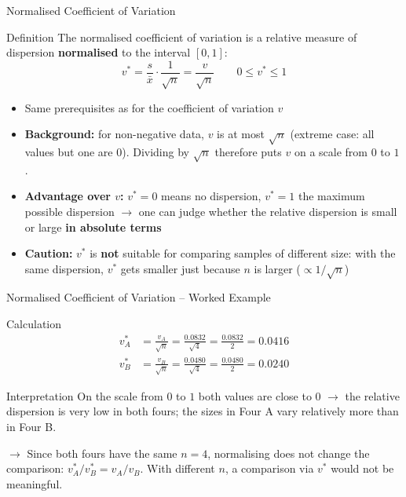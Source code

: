\documentclass[aspectratio=169,11pt]{beamer}
\begin{document}
\begin{frame}{Normalised Coefficient of Variation}
  \begin{block}{Definition}
    The normalised coefficient of variation is a relative measure of dispersion
    \textbf{normalised} to the interval $[0, 1]$:
    \[ v^* = \frac{s}{\bar{x}} \cdot \frac{1}{\sqrt{n}} = \frac{v}{\sqrt{n}} \qquad 0 \leq v^* \leq 1 \]
  \end{block}

  \begin{itemize}
    \item Same prerequisites as for the coefficient of variation $v$
    \item \textbf{Background:} for non-negative data, $v$ is at most $\sqrt{n}$ (extreme case: all
      values but one are $0$). Dividing by $\sqrt{n}$ therefore puts $v$ on a scale from $0$ to $1$.
    \item \textbf{Advantage over $v$:} $v^* = 0$ means no dispersion, $v^* = 1$ the maximum possible
      dispersion $\to$ one can judge whether the relative dispersion is small or large
      \textbf{in absolute terms}
    \item \textbf{Caution:} $v^*$ is \textbf{not} suitable for comparing samples of different size:
      with the same dispersion, $v^*$ gets smaller just because $n$ is larger ($\propto 1/\sqrt{n}$)
  \end{itemize}
\end{frame}

\begin{frame}{Normalised Coefficient of Variation -- Worked Example}

  \begin{exampleblock}{Calculation}
    \begin{align*}
      v^*_A &= \frac{v_A}{\sqrt{n}} = \frac{0.0832}{\sqrt{4}} = \frac{0.0832}{2} = 0.0416 \\[4pt]
      v^*_B &= \frac{v_B}{\sqrt{n}} = \frac{0.0480}{\sqrt{4}} = \frac{0.0480}{2} = 0.0240
    \end{align*}
  \end{exampleblock}

  \vspace{0.2cm}

  \begin{alertblock}{Interpretation}
    On the scale from $0$ to $1$ both values are close to $0$ $\to$ the relative dispersion is
    very low in both fours; the sizes in Four A vary relatively more than in Four B.

    $\to$ Since both fours have the same $n = 4$, normalising does not change the comparison:
    $v^*_A / v^*_B = v_A / v_B$. With different $n$, a comparison via $v^*$ would not be meaningful.
  \end{alertblock}
\end{frame}
\end{document}
